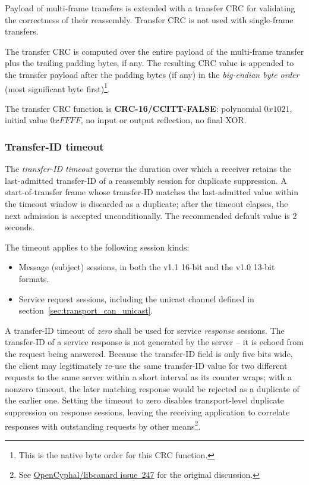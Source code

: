Payload of multi-frame transfers is extended with a transfer CRC for validating the correctness of their reassembly.
Transfer CRC is not used with single-frame transfers.

The transfer CRC is computed over the entire payload of the multi-frame transfer
plus the trailing padding bytes, if any.
The resulting CRC value is appended to the transfer payload after the padding bytes (if any)
in the \emph{big-endian byte order} (most significant byte first)\footnote{%
    This is the native byte order for this CRC function.
}.

The transfer CRC function is \textbf{CRC-16/CCITT-FALSE}:
polynomial $0x1021$, initial value $0xFFFF$, no input or output reflection, no final XOR.

\subsubsection{Transfer-ID timeout}\label{sec:transport_can_transfer_id_timeout}

The \emph{transfer-ID timeout} governs the duration over which a receiver retains the last-admitted
transfer-ID of a reassembly session for duplicate suppression. A start-of-transfer frame whose transfer-ID
matches the last-admitted value within the timeout window is discarded as a duplicate;
after the timeout elapses, the next admission is accepted unconditionally.
The recommended default value is $2$ seconds.

The timeout applies to the following session kinds:
\begin{itemize}
    \item Message (subject) sessions, in both the v1.1 16-bit and the v1.0 13-bit formats.
    \item Service request sessions, including the unicast channel defined in section~\ref{sec:transport_can_unicast}.
\end{itemize}

A transfer-ID timeout of \emph{zero} shall be used for service \emph{response} sessions.
The transfer-ID of a service response is not generated by the server -- it is echoed from the request being answered.
Because the transfer-ID field is only five bits wide, the client may legitimately re-use the same
transfer-ID value for two different requests to the same server within a short interval as its counter wraps;
with a nonzero timeout, the later matching response would be rejected as a duplicate of the earlier one.
Setting the timeout to zero disables transport-level duplicate suppression on response sessions,
leaving the receiving application to correlate responses with outstanding requests by other means\footnote{%
    See \href{https://github.com/OpenCyphal/libcanard/issues/247}{OpenCyphal/libcanard issue~247}
    for the original discussion.
}.

